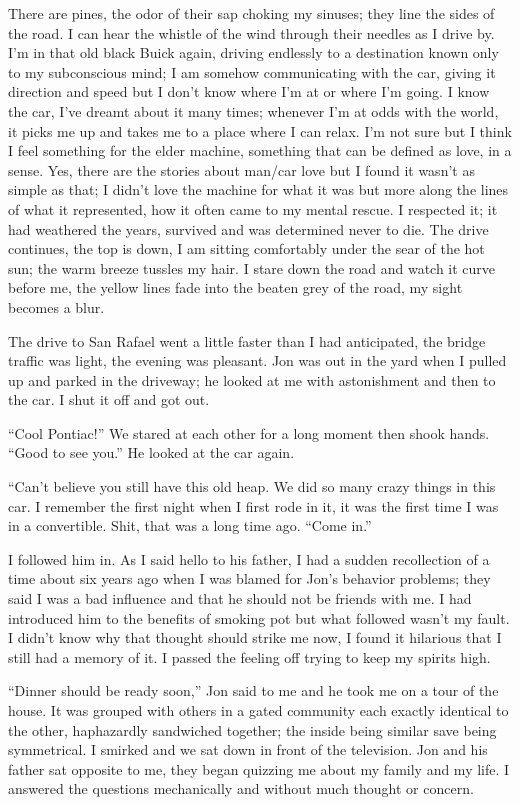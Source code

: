 There are pines, the odor of their sap choking my sinuses; they line the
sides of the road. I can hear the whistle of the wind through their
needles as I drive by. I'm in that old black Buick again, driving
endlessly to a destination known only to my subconscious mind; I am
somehow communicating with the car, giving it direction and speed but I
don't know where I'm at or where I'm going. I know the car, I've dreamt
about it many times; whenever I'm at odds with the world, it picks me up
and takes me to a place where I can relax. I'm not sure but I think I
feel something for the elder machine, something that can be defined as
love, in a sense. Yes, there are the stories about man/car love but I
found it wasn't as simple as that; I didn't love the machine for what it
was but more along the lines of what it represented, how it often came
to my mental rescue. I respected it; it had weathered the years,
survived and was determined never to die. The drive continues, the top
is down, I am sitting comfortably under the sear of the hot sun; the
warm breeze tussles my hair. I stare down the road and watch it curve
before me, the yellow lines fade into the beaten grey of the road, my
sight becomes a blur.

The drive to San Rafael went a little faster than I had anticipated, the
bridge traffic was light, the evening was pleasant. Jon was out in the
yard when I pulled up and parked in the driveway; he looked at me with
astonishment and then to the car. I shut it off and got out.

``Cool Pontiac!'' We stared at each other for a long moment then shook
hands. ``Good to see you.'' He looked at the car again.

``Can't believe you still have this old heap. We did so many crazy
things in this car. I remember the first night when I first rode in it,
it was the first time I was in a convertible. Shit, that was a long time
ago. ``Come in.''

I followed him in. As I said hello to his father, I had a sudden
recollection of a time about six years ago when I was blamed for Jon's
behavior problems; they said I was a bad influence and that he should
not be friends with me. I had introduced him to the benefits of smoking
pot but what followed wasn't my fault. I didn't know why that thought
should strike me now, I found it hilarious that I still had a memory of
it. I passed the feeling off trying to keep my spirits high.

``Dinner should be ready soon,'' Jon said to me and he took me on a tour
of the house. It was grouped with others in a gated community each
exactly identical to the other, haphazardly sandwiched together; the
inside being similar save being symmetrical. I smirked and we sat down
in front of the television. Jon and his father sat opposite to me, they
began quizzing me about my family and my life. I answered the questions
mechanically and without much thought or concern.

